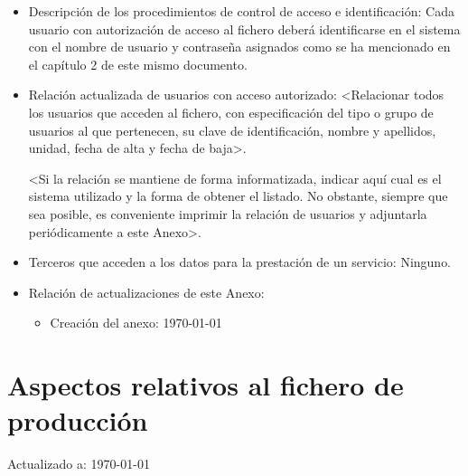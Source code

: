 \documentclass[a4paper,11pt,bibtotoc,noliststotoc]{scrbook}
\begin{document}
\begin{itemize}
\item Descripción de los procedimientos de control de acceso e identificación: Cada usuario con autorización de acceso al fichero deberá identificarse en el sistema con el nombre de usuario y contraseña asignados como se ha mencionado en el capítulo 2 de este mismo documento.

\item Relación actualizada de usuarios con acceso autorizado: <Relacionar todos los usuarios que acceden al fichero, con especificación del tipo o grupo de usuarios al que pertenecen, su clave de identificación, nombre y apellidos, unidad, fecha de alta y fecha de baja>.

<Si la relación se mantiene de forma informatizada, indicar aquí cual es el sistema utilizado y la forma de obtener el listado. No obstante, siempre que sea posible, es conveniente imprimir la relación de usuarios y adjuntarla periódicamente a este Anexo>.

\item Terceros que acceden a los datos para la prestación de un servicio: Ninguno.

\item Relación de actualizaciones de este Anexo: 

	\begin{itemize}
	\item Creación del anexo: \today
	\end{itemize}

\end{itemize}








\section{Aspectos relativos al fichero de producción}


Actualizado a: \today
\end{document}
